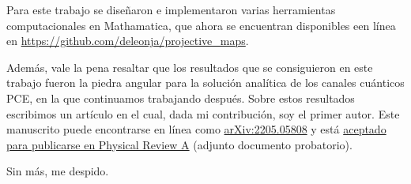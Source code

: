 \documentclass[letterpaper, 11pt]{letter}
\begin{document}
\begin{letter}
Para este trabajo se diseñaron e implementaron varias herramientas computacionales en Mathamatica, que ahora se encuentran disponibles een línea en \href{https://github.com/deleonja/projective_maps}{https://github.com/deleonja/projective\_maps}.

Además, vale la pena resaltar que los resultados que se consiguieron
en este trabajo fueron la piedra angular para la solución analítica 
de los canales cuánticos PCE, en la que continuamos trabajando después.
Sobre estos resultados escribimos un artículo en el cual, dada mi contribución, 
soy el primer autor. Este manuscrito puede encontrarse en línea como \href{https://arxiv.org/abs/2205.05808}{arXiv:2205.05808} y está \href{https://journals.aps.org/pra/accepted/b5079Nf1F601ce2282552ec77ee4339c9ce815341}{aceptado para publicarse en Physical Review A} (adjunto documento probatorio). 

\closing{Sin más, me despido.}

\end{letter}
\end{document}
